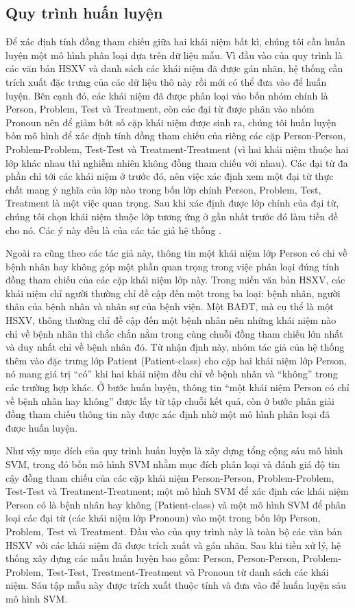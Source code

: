 \subsection*{Quy trình huấn luyện}
Để xác định tính đồng tham chiếu giữa hai khái niệm bất kì, chúng tôi cần huấn luyện một mô hình phân loại dựa trên dữ liệu mẫu. Vì đầu vào của quy trình là các văn bản HSXV và danh sách các khái niệm đã được gán nhãn, hệ thống cần trích xuất đặc trưng của các dữ liệu thô này rồi mới có thể đưa vào để huấn luyện. Bên cạnh đó, các khái niệm đã được phân loại vào bốn nhóm chính là Person, Problem, Test và Treatment, còn các đại từ được phân vào nhóm Pronoun nên để giảm bớt số cặp khái niệm được sinh ra, chúng tôi huấn luyện bốn mô hình để xác định tính đồng tham chiếu của riêng các cặp Person-Person, Problem-Problem, Test-Test và Treatment-Treatment (vì hai khái niệm thuộc hai lớp khác nhau thì nghiễm nhiên không đồng tham chiếu với nhau). Các đại từ đa phần chỉ tới các khái niệm ở trước đó, nên việc xác định xem một đại từ thực chất mang ý nghĩa của lớp nào trong bốn lớp chính Person, Problem, Test, Treatment là một việc quan trọng. Sau khi xác định được lớp chính của đại từ, chúng tôi chọn khái niệm thuộc lớp tương ứng ở gần nhất trước đó làm tiền đề cho nó. Các ý này đều là của các tác giả hệ thống \cite{YanXu2012}.

Ngoài ra cũng theo các tác giả này, thông tin một khái niệm lớp Person có chỉ về bệnh nhân hay không góp một phần quan trọng trong việc phân loại đúng tính đồng tham chiếu của các cặp khái niệm lớp này. Trong miền văn bản HSXV, các khái niệm chỉ người thường chỉ đề cập đến một trong ba loại: bệnh nhân, người thân của bệnh nhân và nhân sự của bệnh viện. Một BAĐT, mà cụ thể là một HSXV, thông thường chỉ đề cập đến một bệnh nhân nên những khái niệm nào chỉ về bệnh nhân thì chắc chắn nằm trong cùng chuỗi đồng tham chiếu lớn nhất và duy nhất chỉ về bệnh nhân đó. Từ nhận định này, nhóm tác giả của hệ thống \cite{YanXu2012} thêm vào đặc trưng lớp Patient (Patient-class) cho cặp hai khái niệm lớp Person, nó mang giá trị ``có'' khi hai khái niệm đều chỉ về bệnh nhân và ``không'' trong các trường hợp khác. Ở bước huấn luyện, thông tin ``một khái niệm Person có chỉ về bệnh nhân hay không'' được lấy từ tập chuỗi kết quả, còn ở bước phân giải đồng tham chiếu thông tin này được xác định nhờ một mô hình phân loại đã được huấn luyện.

Như vậy mục đích của quy trình huấn luyện là xây dựng tổng cộng sáu mô hình SVM, trong đó bốn mô hình SVM nhằm mục đích phân loại và đánh giá độ tin cậy đồng tham chiếu của các cặp khái niệm Person-Person, Problem-Problem, Test-Test và Treatment-Treatment; một mô hình SVM để xác định các khái niệm Person có là bệnh nhân hay không (Patient-class) và một mô hình SVM để phân loại các đại từ (các khái niệm lớp Pronoun) vào một trong bốn lớp Person, Problem, Test và Treatment. Đầu vào của quy trình này là toàn bộ các văn bản HSXV với các khái niệm đã được trích xuất và gán nhãn. Sau khi tiền xử lý, hệ thống xây dựng các mẫu huấn luyện bao gồm: Person, Person-Person, Problem-Problem, Test-Test, Treatment-Treatment và Pronoun từ danh sách các khái niệm. Sáu tập mẫu này được trích xuất thuộc tính và đưa vào để huấn luyện sáu mô hình SVM. 

